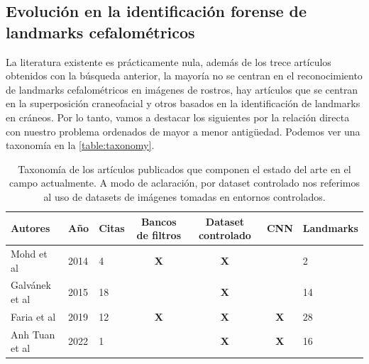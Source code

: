         

        \subsection{Evolución en la identificación forense de landmarks cefalométricos}
            
            \noindent La literatura existente es prácticamente nula, además de los trece artículos obtenidos con la búsqueda anterior, la mayoría no se centran en el reconocimiento de landmarks cefalométricos en imágenes de rostros, hay artículos que se centran en la superposición craneofacial y otros basados en la identificación de landmarks en cráneos. Por lo tanto, vamos a destacar los siguientes por la relación directa con nuestro problema ordenados de mayor a menor antigüedad. Podemos ver una taxonomía en la \autoref{table:taxonomy}. 

            \begin{table}[!ht]
                \centering
                \caption{Taxonomía de los artículos publicados que componen el estado del arte en el campo actualmente. A modo de aclaración, por dataset controlado nos referimos al uso de datasets de imágenes tomadas en entornos controlados.}
                \begin{tabular}{|l|l|l|c|c|c|l|}
                \hline
                    \cellcolor{gray!50}\textbf{Autores} & \cellcolor{gray!50}\textbf{Año} & \cellcolor{gray!50}\textbf{Citas} & \cellcolor{gray!50}\textbf{Bancos de filtros} & \cellcolor{gray!50}\textbf{Dataset controlado} & \cellcolor{gray!50}\textbf{CNN} & \cellcolor{gray!50}\textbf{Landmarks}\\ \hline
                    Mohd et al & 2014 & 4 & \cellcolor{gray!15} \textbf{X} & \cellcolor{gray!15} \textbf{X} & ~ & 2 \\ \hline
                    Galvánek et al & 2015 & 18 & ~ & \cellcolor{gray!15} \textbf{X} & ~ & 14 \\ \hline
                    Faria et al & 2019 & 12 & \cellcolor{gray!15}\textbf{X} & \cellcolor{gray!15}\textbf{X}& \cellcolor{gray!15}\textbf{X} & 28 \\ \hline
                    Anh Tuan et al & 2022 & 1 & ~ & \cellcolor{gray!15}\textbf{X} & \cellcolor{gray!15}\textbf{X}& 16 \\ \hline
                \end{tabular}
                \label{table:taxonomy}
            \end{table}

